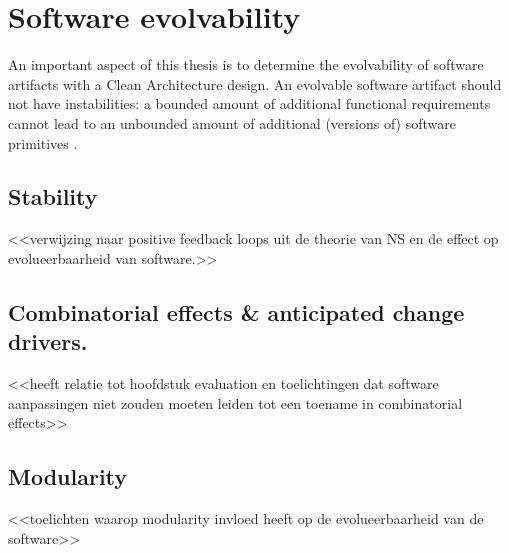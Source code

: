 \section{Software evolvability} \label{software_evolvability}

An important aspect of this thesis is to determine the evolvability of software artifacts
with a Clean Architecture design. An evolvable software artifact should not have
instabilities: a bounded amount of additional functional requirements cannot lead to an
unbounded amount of additional (versions of) software primitives \parencite[273]{mannaert_normalized_2009}. 

\subsection{Stability}
<<verwijzing naar positive feedback loops uit de theorie van NS en de effect op
evolueerbaarheid van software.>>

\subsection{Combinatorial effects \& anticipated change drivers.}
<<heeft relatie tot hoofdstuk evaluation en toelichtingen dat software aanpassingen niet
zouden moeten leiden tot een toename in combinatorial effects>>

\subsection{Modularity}
<<toelichten waarop modularity invloed heeft op de evolueerbaarheid van de software>>

